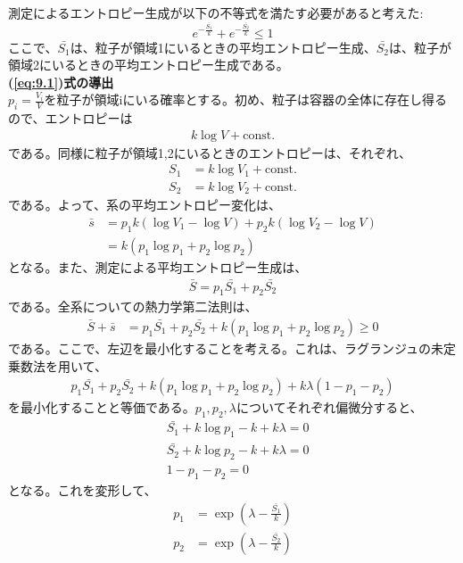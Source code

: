 \documentclass[a4paper,11pt]{jsarticle}
\numberwithin{equation}{section}
\begin{document}
測定によるエントロピー生成が以下の不等式を満たす必要があると考えた:
\begin{equation}
    e^{-\frac{\bar{S_1}}{k}} + e^{-\frac{\bar{S_2}}{k}} \leq 1 \label{eq:9.1}
\end{equation}
ここで、$\bar{S_1}$は、粒子が領域1にいるときの平均エントロピー生成、$\bar{S_2}$は、粒子が領域2にいるときの平均エントロピー生成である。\\
\textbf{(\ref{eq:9.1})式の導出}\\
$p_i = \frac{V_i}{V}$を粒子が領域iにいる確率とする。初め、粒子は容器の全体に存在し得るので、エントロピーは
\begin{align}
k\log V + \text{const.}
\end{align}
である。同様に粒子が領域1,2にいるときのエントロピーは、それぞれ、
\begin{align}
    S_1 &= k\log V_1 + \text{const.} \\
    S_2 &= k\log V_2 + \text{const.}
\end{align}
である。よって、系の平均エントロピー変化は、
\begin{align}
    \bar{s} &=p_1k(\log V_1 - \log V) + p_2k(\log V_2 - \log V) \\
    &= k(p_1\log p_1 + p_2\log p_2)
\end{align}
となる。また、測定による平均エントロピー生成は、
\begin{align}
    \bar{S} = p_1\bar{S_1} + p_2\bar{S_2}
\end{align}
である。全系についての熱力学第二法則は、
\begin{align}
    \bar{S} + \bar{s} &= p_1\bar{S_1} + p_2\bar{S_2} + k(p_1\log p_1 + p_2\log p_2) \geq 0
\end{align}
である。ここで、左辺を最小化することを考える。これは、ラグランジュの未定乗数法を用いて、
\begin{align}
    p_1\bar{S_1} + p_2\bar{S_2} + k(p_1\log p_1 + p_2\log p_2) + k\lambda(1-p_1-p_2)
\end{align}
を最小化することと等価である。$p_1,p_2,\lambda$についてそれぞれ偏微分すると、
\begin{align}
    &\bar{S_1} +k\log p_1 - k + k\lambda = 0 \\
    &\bar{S_2} +k\log p_2 - k + k\lambda = 0 \\
    &1-p_1-p_2 = 0
\end{align}
となる。これを変形して、
\begin{align}
    p_1 &= \exp(\lambda - \frac{\bar{S_1}}{k}) \\
    p_2 &= \exp(\lambda - \frac{\bar{S_2}}{k})
\end{align}
\end{document}
